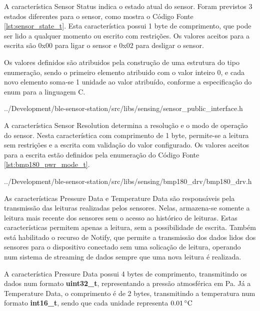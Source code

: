 A característica Sensor Status indica o estado atual do sensor. Foram previstos
3 estados diferentes para o sensor, como mostra o Código Fonte
\ref{lst:sensor_state_t}. Esta característica possui 1 byte de comprimento, que
pode ser lido a qualquer momento ou escrito com restrições. Os valores aceitos
para a escrita são 0x00 para ligar o sensor e 0x02 para
desligar o sensor.

Os valores definidos são atribuidos pela construção de uma estrutura do tipo
enumeração, sendo o primeiro elemento atribuido com o valor inteiro 0, e
cada novo elemento soma-se 1 unidade ao valor atribuído, conforme
a especificação do enum para a linguagem C.\cite{C99Spec}

\begin{minipage}{0.95\linewidth}

{../Development/ble-sensor-station/src/libs/sensing/sensor_public_interface.h}
\end{minipage}

A característica Sensor Resolution determina a resolução e o modo de operação do
sensor. Nesta característica com comprimento de 1 byte, permite-se a leitura sem
restrições e a escrita com validação do valor configurado. Os valores aceitos
para a escrita estão definidos pela enumeração do Código Fonte \ref{lst:bmp180_pwr_mode_t}.
\cite{BMP180Datasheet}

\begin{minipage}{0.95\linewidth}

{../Development/ble-sensor-station/src/libs/sensing/bmp180_drv/bmp180_drv.h}
\end{minipage}

As características Pressure Data e Temperature Data são responsáveis pela
transmissão das leituras realizadas pelos sensores. Nelas, armazena-se somente a
leitura mais recente dos sensores sem o acesso ao histórico de leituras. Estas
características permitem apenas a leitura, sem a possibilidade de escrita.
Também está habilitado o recurso de Notify, que permite a transmissão dos
dados lidos dos sensores para o dispositivo conectado sem uma solicação de
leitura, operando num sistema de streaming de dados sempre que uma nova leitura
é realizada.

A característica Pressure Data possui 4 bytes de comprimento, transmitindo os
dados num formato \textbf{uint32\_t}, representando a pressão atmosférica em Pa.
Já a Temperature Data, o comprimento é de 2 bytes, transmitindo a temperatura
num formato \textbf{int16\_t}, sendo que cada unidade representa
$0.01\,^{\circ}{\rm C}$ 

